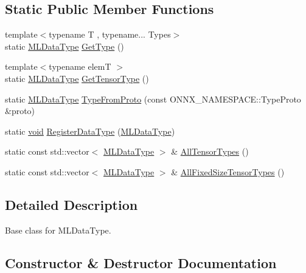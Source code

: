 \subsection*{Static Public Member Functions}
\begin{DoxyCompactItemize}
\item 
{\footnotesize template$<$typename T , typename... Types$>$ }\\static \mbox{\hyperlink{namespaceonnxruntime_ad77d0a6e838ec7da5dc35fed5ee66b49}{M\+L\+Data\+Type}} \mbox{\hyperlink{classonnxruntime_1_1DataTypeImpl_a4a10af95a06b1d04aba64fd7e8c2a8d6}{Get\+Type}} ()
\item 
{\footnotesize template$<$typename elemT $>$ }\\static \mbox{\hyperlink{namespaceonnxruntime_ad77d0a6e838ec7da5dc35fed5ee66b49}{M\+L\+Data\+Type}} \mbox{\hyperlink{classonnxruntime_1_1DataTypeImpl_a7c4a6a7126bc7661eb67af6dfcfad1fb}{Get\+Tensor\+Type}} ()
\item 
static \mbox{\hyperlink{namespaceonnxruntime_ad77d0a6e838ec7da5dc35fed5ee66b49}{M\+L\+Data\+Type}} \mbox{\hyperlink{classonnxruntime_1_1DataTypeImpl_a19d1875191b844febe10a4a62dca8bba}{Type\+From\+Proto}} (const O\+N\+N\+X\+\_\+\+N\+A\+M\+E\+S\+P\+A\+C\+E\+::\+Type\+Proto \&proto)
\item 
static \mbox{\hyperlink{mlasi_8h_a88f941d423cb2a819b70a1358982b1a6}{void}} \mbox{\hyperlink{classonnxruntime_1_1DataTypeImpl_ad3176e13a636bae69d7459e7787a0750}{Register\+Data\+Type}} (\mbox{\hyperlink{namespaceonnxruntime_ad77d0a6e838ec7da5dc35fed5ee66b49}{M\+L\+Data\+Type}})
\item 
static const std\+::vector$<$ \mbox{\hyperlink{namespaceonnxruntime_ad77d0a6e838ec7da5dc35fed5ee66b49}{M\+L\+Data\+Type}} $>$ \& \mbox{\hyperlink{classonnxruntime_1_1DataTypeImpl_a8b0d570d9d2604d314ce528a6a52cdde}{All\+Tensor\+Types}} ()
\item 
static const std\+::vector$<$ \mbox{\hyperlink{namespaceonnxruntime_ad77d0a6e838ec7da5dc35fed5ee66b49}{M\+L\+Data\+Type}} $>$ \& \mbox{\hyperlink{classonnxruntime_1_1DataTypeImpl_a13fe4865247aa546ef89770508d70b00}{All\+Fixed\+Size\+Tensor\+Types}} ()
\end{DoxyCompactItemize}


\subsection{Detailed Description}
Base class for M\+L\+Data\+Type. 

\subsection{Constructor \& Destructor Documentation}
\mbox{\label{classonnxruntime_1_1DataTypeImpl_a2be74407548177f70324adce83c44392}} 
